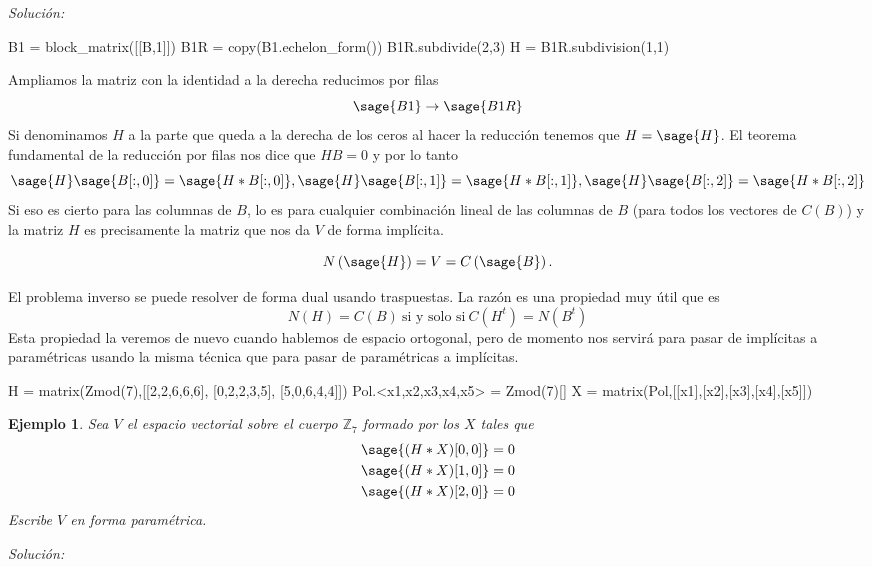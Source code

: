 \documentclass{amsart}
\newtheorem{ejem}{Ejemplo}
\begin{document}
{\it Solución:}

\begin{sageblock}
B1 = block_matrix([[B,1]])
B1R = copy(B1.echelon_form())
B1R.subdivide(2,3)
H = B1R.subdivision(1,1)
\end{sageblock}

Ampliamos la matriz con la identidad a la derecha reducimos por filas
$$ \sage{B1} \to \sage{B1R} $$
Si denominamos $H$ a la parte que queda a la derecha de los ceros al hacer la
reducción tenemos que $H = \sage{H}$. El teorema fundamental de la reducción
por filas nos dice que $HB = 0$ y por lo tanto 
$$ 
\sage{H} \sage{B[:,0]} = \sage{H*B[:,0]},
\sage{H} \sage{B[:,1]} = \sage{H*B[:,1]},
\sage{H} \sage{B[:,2]} = \sage{H*B[:,2]}$$
Si eso es cierto para las columnas de $B$, lo es para cualquier combinación
lineal de las columnas de $B$ (para todos los vectores de $C(B)$) y la matriz
$H$ es precisamente la matriz que nos da $V$ de forma implícita.

$$ N\left(\sage{H}\right) = V = C\left(\sage{B}\right).$$


\vspace{1cm}

El problema inverso se puede resolver de forma dual usando traspuestas. La 
razón es una propiedad muy útil que es 
$$ N(H) = C(B) ~\text{si y solo si}~ C(H^t) = N(B^t)$$
Esta propiedad la veremos de nuevo cuando hablemos de espacio ortogonal, pero
de momento nos servirá para pasar de implícitas a paramétricas usando la misma
técnica que para pasar de paramétricas a implícitas.

\begin{sagecode}
H = matrix(Zmod(7),[[2,2,6,6,6],
[0,2,2,3,5],
[5,0,6,4,4]])
Pol.<x1,x2,x3,x4,x5> = Zmod(7)[]
X = matrix(Pol,[[x1],[x2],[x3],[x4],[x5]])
\end{sagecode}

\begin{ejem}
Sea $V$ el espacio vectorial sobre el cuerpo ${\mathbb Z}_7$ formado por los
$X$ tales que 
\begin{align*}
\sage{(H*X)[0,0]} &= 0 \\
\sage{(H*X)[1,0]} &= 0 \\
\sage{(H*X)[2,0]} &= 0 \\
\end{align*}
Escribe $V$ en forma paramétrica.
\end{ejem}

{\it Solución:}
\end{document}
